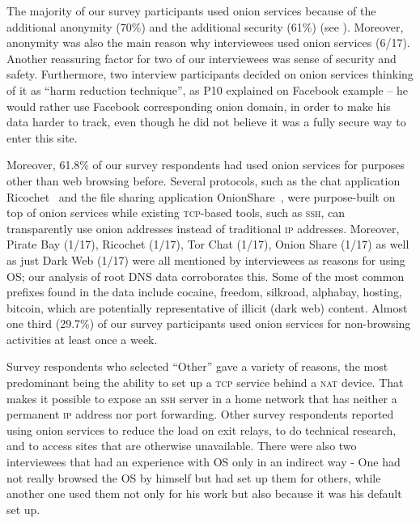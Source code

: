 The majority of our survey participants  used onion services
because of the additional anonymity (70\%) and the additional security (61\%) (see ). Moreover,  anonymity was also the main reason why interviewees used onion services (6/17). Another reassuring factor for two of our interviewees was sense of security and safety. Furthermore, two interview participants decided on onion services thinking of it as “harm reduction technique”, as P10 explained on Facebook example – he would rather use Facebook corresponding onion domain, in order to make his data harder to track, even though he did not believe it was a fully secure way to enter this site.

Moreover, 61.8\% of our survey respondents had used onion services for purposes
other than web browsing before.  Several protocols, such as the chat application
Ricochet~\cite{ricochet} and the file sharing application
OnionShare~\cite{onionshare}, were purpose-built on top of onion services while
existing \textsc{tcp}-based tools, such as \textsc{ssh}, can transparently use
onion addresses instead of traditional \textsc{ip} addresses.  Moreover, Pirate Bay (1/17), Ricochet (1/17), Tor Chat (1/17), Onion Share (1/17) as well as just Dark Web (1/17) were all mentioned by interviewees as reasons for using OS; our analysis of root DNS data corroborates this.  Some of the most common prefixes found in the data include cocaine, freedom, silkroad, alphabay, hosting, bitcoin, which are potentially representative of illicit (dark web) content.
Almost one third
(29.7\%) of our survey participants used onion services for non-browsing activities at
least once a week. 

Survey respondents who selected ``Other'' gave a variety of reasons, the most
predominant being the ability to set up a \textsc{tcp} service behind a
\textsc{nat} device.  That makes it possible to expose an \textsc{ssh} server in
a home network that has neither a permanent \textsc{ip} address nor port
forwarding.  Other survey respondents reported using onion services to reduce the load on exit relays, to do
technical research, and to access sites that are otherwise unavailable. There were also two interviewees that had an experience with OS only in an indirect way - One had not really browsed the OS by himself but had set up them for others, while another one used them not only for his work but also because it was his default set up.


